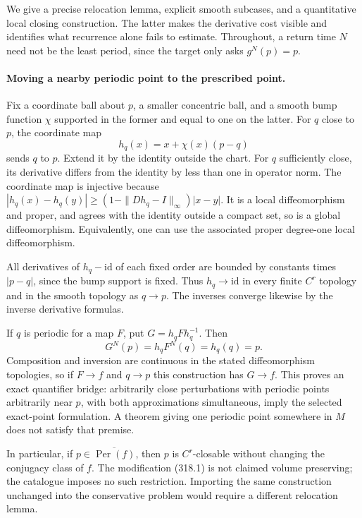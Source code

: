 \documentclass[11pt]{article}
\begin{document}
We give a precise relocation lemma, explicit smooth subcases, and
a quantitative local closing construction. The latter makes the
derivative cost visible and identifies what recurrence alone fails
to estimate. Throughout, a return time $N$ need not be the least
period, since the target only asks $g^N(p)=p$.

\paragraph{Moving a nearby periodic point to the prescribed point.}
Fix a coordinate ball about $p$, a smaller concentric ball, and a
smooth bump function $\chi$ supported in the former and equal to
one on the latter. For $q$ close to $p$, the coordinate map
\[
 h_q(x)=x+\chi(x)(p-q)
 \tag{318.1}
\]
sends $q$ to $p$. Extend it by the identity outside the chart.
For $q$ sufficiently close, its derivative differs from the identity
by less than one in operator norm. The coordinate map is injective
because
$|h_q(x)-h_q(y)|\geq(1-\|Dh_q-I\|_\infty)|x-y|$.
It is a local diffeomorphism and proper, and agrees with the identity
outside a compact set, so is a global diffeomorphism. Equivalently,
one can use the associated proper degree-one local diffeomorphism.

All derivatives of $h_q-\mathrm{id}$ of each fixed order are
bounded by constants times $|p-q|$, since the bump support is fixed.
Thus $h_q\to\mathrm{id}$ in every finite $C^r$ topology and in
the smooth topology as $q\to p$. The inverses converge likewise
by the inverse derivative formulas.

If $q$ is periodic for a map $F$, put $G=h_qFh_q^{-1}$. Then
\[
 G^N(p)=h_qF^N(q)=h_q(q)=p.
 \tag{318.2}
\]
Composition and inversion are continuous in the stated
diffeomorphism topologies, so if $F\to f$ and $q\to p$ this
construction has $G\to f$. This proves an exact quantifier bridge:
arbitrarily close perturbations with periodic points arbitrarily
near $p$, with both approximations simultaneous, imply the selected
exact-point formulation. A theorem giving one periodic point
somewhere in $M$ does not satisfy that premise.

In particular, if $p\in\overline{\operatorname{Per}(f)}$, then
$p$ is $C^r$-closable without changing the conjugacy class of $f$.
The modification (318.1) is not claimed volume preserving; the
catalogue imposes no such restriction. Importing the same construction
unchanged into the conservative problem would require a different
relocation lemma.
\end{document}
